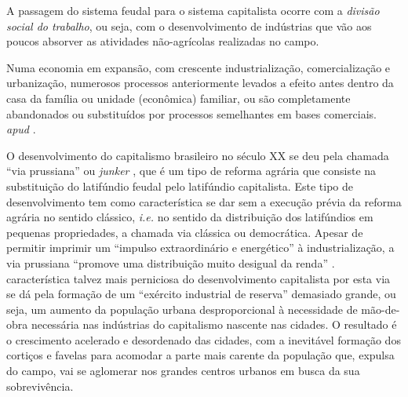 \documentclass[
	12pt,				%
	oneside,			%
	a4paper,			%
	chapter=TITLE,		%
	section=TITLE,		%
	english,			%
	brazil				%
	]{abntex2}
\begin{document}
A passagem do sistema feudal para o sistema capitalista ocorre com a \emph{divisão
social do trabalho}, ou seja, com o desenvolvimento de indústrias que vão aos
poucos absorver as atividades não-agrícolas realizadas no campo.
\begin{citacao}
Numa economia em expansão, com crescente industrialização, comercialização e
urbanização, numerosos processos anteriormente levados a efeito antes dentro da
casa da família ou unidade (econômica) familiar, ou são completamente
abandonados ou substituídos por processos semelhantes em bases
comerciais. \cite[p. 41]{kuznets} \textit{apud} \cite[p. 218]{rangel1956}.
\end{citacao}
O desenvolvimento do capitalismo brasileiro no século XX se deu pela chamada
``via prussiana'' ou \emph{junker} \autocite[155]{rangel1988}, que é um tipo de reforma agrária
que consiste na substituição do latifúndio feudal pelo latifúndio capitalista.
Este tipo de desenvolvimento tem como característica se dar sem a execução
prévia da reforma agrária no sentido clássico, \emph{i.e.} no sentido da distribuição
dos latifúndios em pequenas propriedades, a chamada via clássica ou democrática.
Apesar de permitir imprimir um ``impulso extraordinário e energético'' à
industrialização, a via prussiana ``promove uma distribuição muito desigual da
renda'' \autocite[155]{rangel1988}. característica talvez mais perniciosa do
desenvolvimento capitalista por esta via se dá pela formação de um ``exército
industrial de reserva'' demasiado grande, ou seja, um aumento da população urbana
desproporcional à necessidade de mão-de-obra necessária nas indústrias do
capitalismo nascente nas cidades. O resultado é o crescimento acelerado e
desordenado das cidades, com a inevitável formação dos cortiços e favelas para
acomodar a parte mais carente da população que, expulsa do campo, vai se
aglomerar nos grandes centros urbanos em busca da sua sobrevivência.
\end{document}
